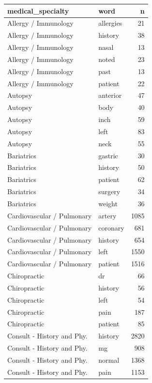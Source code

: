 \documentclass[
]{article}
\begin{document}
\begin{table}
\centering
\begin{tabular}{l|l|r}
\hline
medical\_specialty & word & n\\
\hline
Allergy / Immunology & allergies & 21\\
\hline
Allergy / Immunology & history & 38\\
\hline
Allergy / Immunology & nasal & 13\\
\hline
Allergy / Immunology & noted & 23\\
\hline
Allergy / Immunology & past & 13\\
\hline
Allergy / Immunology & patient & 22\\
\hline
Autopsy & anterior & 47\\
\hline
Autopsy & body & 40\\
\hline
Autopsy & inch & 59\\
\hline
Autopsy & left & 83\\
\hline
Autopsy & neck & 55\\
\hline
Bariatrics & gastric & 30\\
\hline
Bariatrics & history & 50\\
\hline
Bariatrics & patient & 62\\
\hline
Bariatrics & surgery & 34\\
\hline
Bariatrics & weight & 36\\
\hline
Cardiovascular / Pulmonary & artery & 1085\\
\hline
Cardiovascular / Pulmonary & coronary & 681\\
\hline
Cardiovascular / Pulmonary & history & 654\\
\hline
Cardiovascular / Pulmonary & left & 1550\\
\hline
Cardiovascular / Pulmonary & patient & 1516\\
\hline
Chiropractic & dr & 66\\
\hline
Chiropractic & history & 56\\
\hline
Chiropractic & left & 54\\
\hline
Chiropractic & pain & 187\\
\hline
Chiropractic & patient & 85\\
\hline
Consult - History and Phy. & history & 2820\\
\hline
Consult - History and Phy. & mg & 908\\
\hline
Consult - History and Phy. & normal & 1368\\
\hline
Consult - History and Phy. & pain & 1153\\

\end{tabular}
\end{table}
\end{document}
